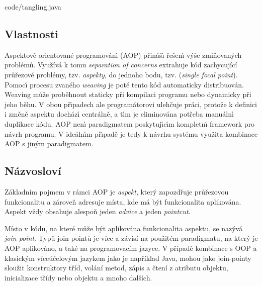 
{code/tangling.java}

\subsection{Vlastnosti}
Aspektově orientované programován\'{\i} (\gls{AOP}) přináš\'{\i} řešen\'{\i}
v\'yše zmiňovaných problémů. Využívá k tomu \textit{separation of concerns} \textendash\xspace
extrahuje kód zachycující průřezové problémy, tzv. \textit{aspekty}, do jednoho bodu, tzv. (\textit{single focal point}).
Pomoc\'{\i} procesu zvaného \textit{weaving} je poté tento kód automaticky distribuován.
Weaving může proběhnout staticky při kompilaci programu nebo dynamicky
při jeho běhu. V obou př\'{\i}padech ale programátorovi ulehčuje práci,
protože k definici i změně aspektu docház\'{\i} centrálně, a t\'{\i}m je eliminována
potřeba manuáln\'{\i} duplikace kódu. \gls{AOP} nen\'{\i} paradigmatem poskytuj\'{\i}c\'{\i}m
kompletn\'{\i} framework pro návrh programu. V ideáln\'{\i}m př\'{\i}padě je tedy k návrhu
systému využita kombinace \gls{AOP} s jin\'ym paradigmatem.

\subsection{Názvosloví}

Základním pojmem v rámci \gls{AOP} je \textit{aspekt},
který zapozdřuje průřezovou funkcionalitu a zároveň adresuje místa, kde má být
funkcionalita aplikována. Aspekt vždy obsahuje alespoň jeden \textit{advice}
a jeden \textit{pointcut}.

Místo v kódu, na které může být aplikována funkcionalita aspektu, se nazývá
\textit{join-point}. Typů join-pointů je více a závisí na použitém paradigmatu,
na který je \gls{AOP} aplikováno, a také na programovacím jazyce. V případě
kombinace s \gls{OOP} a klasickým víceúčelovým jazykem jako je například Java,
mohou jako join-pointy sloužit konstruktory tříd, volání metod, zápis a čtení
z atributu objektu, inicializace třídy nebo objektu a mnoho dalších.

